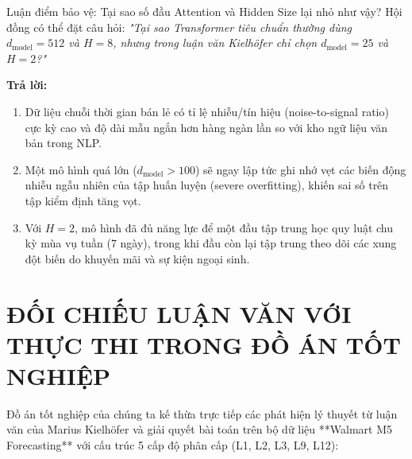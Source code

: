 \documentclass[12pt,a4paper,oneside]{article}
\begin{document}
\begin{defensebox}{Luận điểm bảo vệ: Tại sao số đầu Attention và Hidden Size lại nhỏ như vậy?}
    Hội đồng có thể đặt câu hỏi: \textit{"Tại sao Transformer tiêu chuẩn thường dùng $d_{\text{model}} = 512$ và $H = 8$, nhưng trong luận văn Kielhöfer chỉ chọn $d_{\text{model}} = 25$ và $H = 2$?"}
    
    \textbf{Trả lời:}
    \begin{enumerate}
        \item Dữ liệu chuỗi thời gian bán lẻ có tỉ lệ nhiễu/tín hiệu (noise-to-signal ratio) cực kỳ cao và độ dài mẫu ngắn hơn hàng ngàn lần so với kho ngữ liệu văn bản trong NLP.
        \item Một mô hình quá lớn ($d_{\text{model}} > 100$) sẽ ngay lập tức ghi nhớ vẹt các biến động nhiễu ngẫu nhiên của tập huấn luyện (severe overfitting), khiến sai số trên tập kiểm định tăng vọt.
        \item Với $H = 2$, mô hình đã đủ năng lực để một đầu tập trung học quy luật chu kỳ mùa vụ tuần (7 ngày), trong khi đầu còn lại tập trung theo dõi các xung đột biến do khuyến mãi và sự kiện ngoại sinh.
    \end{enumerate}
\end{defensebox}

\newpage
\section{ĐỐI CHIẾU LUẬN VĂN VỚI THỰC THI TRONG ĐỒ ÁN TỐT NGHIỆP}
\label{sec:doi_chieu_do_an}

Đồ án tốt nghiệp của chúng ta kế thừa trực tiếp các phát hiện lý thuyết từ luận văn của Marius Kielh\"{o}fer và giải quyết bài toán trên bộ dữ liệu **Walmart M5 Forecasting** với cấu trúc 5 cấp độ phân cấp (L1, L2, L3, L9, L12):
\end{document}

